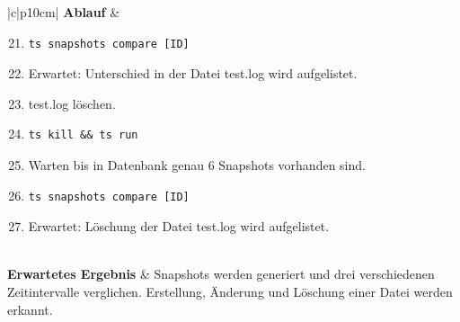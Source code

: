 \documentclass[a4paper,12pt]{report}
\begin{document}
    \begin{table}[h!]
        \centering
        \setlength{\leftmargini}{0.8cm}
        \begin{tabular}{|c|p{10cm}|}
            \hline
            \textbf{Ablauf} &
            \begin{enumerate}
                \setcounter{enumi}{20}
                \item \begin{verbatim}ts snapshots compare [ID]
                \end{verbatim}
                \item Erwartet: Unterschied in der Datei test.log wird aufgelistet.
                \item test.log löschen.
                \item \begin{verbatim}ts kill && ts run
                \end{verbatim}
                \item Warten bis in Datenbank genau 6 Snapshots vorhanden sind.
                \item \begin{verbatim}ts snapshots compare [ID]
                \end{verbatim}
                \item Erwartet: Löschung der Datei test.log wird aufgelistet.
            \end{enumerate} \\ \hline
            \textbf{Erwartetes Ergebnis} & Snapshots werden generiert und drei verschiedenen Zeitintervalle verglichen.
            Erstellung, Änderung und Löschung einer Datei werden erkannt. \\ \hline
        \end{tabular}
        \caption{Manueller End-2-End Test E2E-007}\label{tab:e2e-7.2}
    \end{table}
\end{document}
